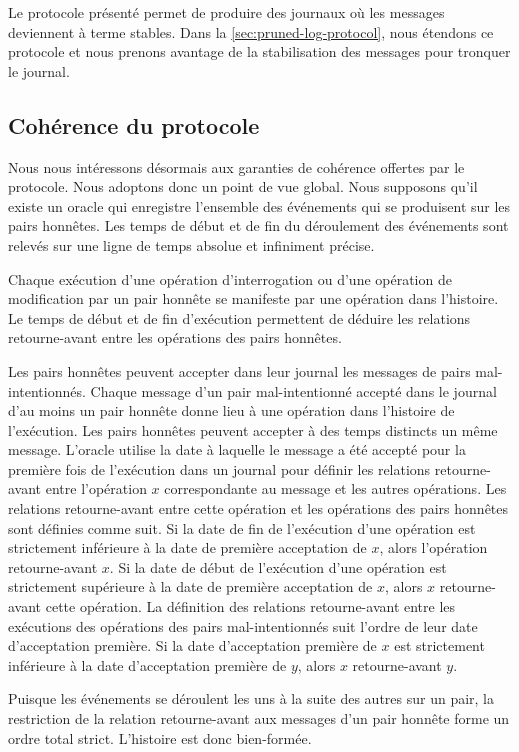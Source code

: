 Le protocole présenté permet de produire des journaux où les messages deviennent à terme stables.
Dans la \autoref{sec:pruned-log-protocol}, nous étendons ce protocole et nous prenons avantage de la stabilisation des messages pour tronquer le journal.


\subsection{Cohérence du protocole}

Nous nous intéressons désormais aux garanties de cohérence offertes par le protocole.
Nous adoptons donc un point de vue global.
Nous supposons qu'il existe un oracle qui enregistre l'ensemble des événements qui se produisent sur les pairs honnêtes.
Les temps de début et de fin du déroulement des événements sont relevés sur une ligne de temps absolue et infiniment précise.

Chaque exécution d'une opération d'interrogation ou d'une opération de modification par un pair honnête se manifeste par une opération dans l'histoire.
Le temps de début et de fin d'exécution permettent de déduire les relations retourne-avant entre les opérations des pairs honnêtes.

Les pairs honnêtes peuvent accepter dans leur journal les messages de pairs mal-intentionnés.
Chaque message d'un pair mal-intentionné accepté dans le journal d'au moins un pair honnête donne lieu à une opération dans l'histoire de l'exécution.
Les pairs honnêtes peuvent accepter à des temps distincts un même message.
L'oracle utilise la date à laquelle le message a été accepté pour la première fois de l'exécution dans un journal pour définir les relations retourne-avant entre l'opération $x$ correspondante au message et les autres opérations.
Les relations retourne-avant entre cette opération et les opérations des pairs honnêtes sont définies comme suit.
Si la date de fin de l'exécution d'une opération est strictement inférieure à la date de première acceptation de $x$, alors l'opération retourne-avant $x$.
Si la date de début de l'exécution d'une opération est strictement supérieure à la date de première acceptation de $x$, alors $x$ retourne-avant cette opération.
La définition des relations retourne-avant entre les exécutions des opérations des pairs mal-intentionnés suit l'ordre de leur date d'acceptation première.
Si la date d'acceptation première de $x$ est strictement inférieure à la date d'acceptation première de $y$, alors $x$ retourne-avant $y$.

Puisque les événements se déroulent les uns à la suite des autres sur un pair, la restriction de la relation retourne-avant aux messages d'un pair honnête forme un ordre total strict.
L'histoire est donc bien-formée.

